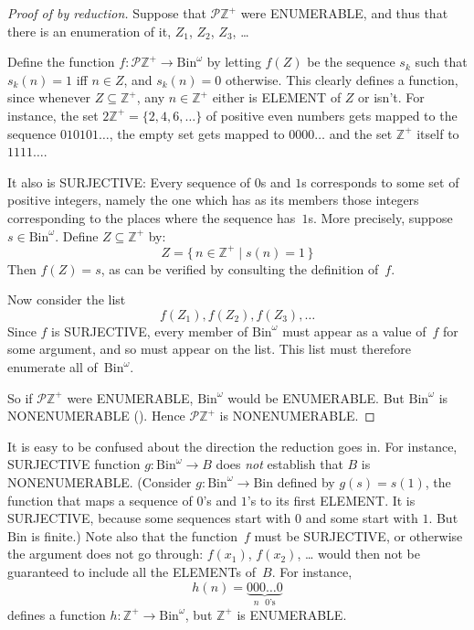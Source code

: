 \documentclass[10pt,a4paper]{article}
\makeatletter
\newcommand*{\olup}[1]{\MakeUppercase{#1}}
\theoremstyle{plain}
\theoremstyle{definition}
\theoremstyle{remark}
\newenvironment{explain}{}{}
\newcommand{\olref}{\@ifnextchar[{\olref@i}{\olref@final}}
\def\olref@i[#1]{\@ifnextchar[{\olref@ii}{\olref@final}}
\def\olref@ii[#1]{\@ifnextchar[{\olref@iii}{\olref@final}}
\def\olref@iii[#1]{\olref@final}
\def\olref@final#1{\ref{#1}}
\providecommand{\PosInt}{\mathbb{Z}^{+}}
\providecommand{\Bin}{\mathrm{Bin}}
\providecommand{\Pow}{\mathcal{P}}
\providecommand{\Setabs}[2]{\{\, #1 \mid #2 \,\}}
\makeatother
\begin{document}
\begin{proof}[Proof of {\olref[nen]{thm:nonenum-pownat}} by reduction]
Suppose that $\Pow{\PosInt}$ were \olup{enumerable}, and thus that
there is an enumeration of it, $Z_{1}$, $Z_{2}$, $Z_{3}$, \dots

Define the function $f \colon \Pow{\PosInt} \to \Bin^\omega$ by letting
$f(Z)$ be the sequence $s_{k}$ such that $s_{k}(n) = 1$ iff $n \in Z$,
and $s_k(n) = 0$ otherwise.  This clearly defines a function, since
whenever $Z \subseteq \PosInt$, any $n \in \PosInt$ either is
\olup{element} of $Z$ or isn't.  For instance, the set $2\PosInt = \{2,
4, 6, \dots\}$ of positive even numbers gets mapped to the sequence
$010101\dots$, the empty set gets mapped to $0000\dots$ and the set
$\PosInt$ itself to $1111\dots$.

It also is \olup{surjective}: Every sequence of $0$s and $1$s corresponds
to some set of positive integers, namely the one which has as its
members those integers corresponding to the places where the sequence
has~$1$s. More precisely, suppose $s \in \Bin^\omega$.  Define $Z
\subseteq \PosInt$ by:
\[
Z = \Setabs{n \in \PosInt}{s(n) = 1}
\]
Then $f(Z) = s$, as can be verified by consulting the definition
of~$f$.

Now consider the list
\[
f(Z_1), f(Z_2), f(Z_3), \dots
\]
Since $f$ is \olup{surjective}, every member of $\Bin^\omega$ must
appear as a value of~$f$ for some argument, and so must appear on the
list. This list must therefore enumerate all of~$\Bin^\omega$.

So if $\Pow{\PosInt}$ were \olup{enumerable}, $\Bin^\omega$ would be
\olup{enumerable}.  But $\Bin^\omega$ is \olup{nonenumerable}
(\olref[nen]{thm:nonenum-bin-omega}). Hence $\Pow{\PosInt}$ is
\olup{nonenumerable}.
\end{proof}

\begin{explain}
It is easy to be confused about the direction the reduction goes in.
For instance, \olup{surjective} function $g \colon \Bin^\omega \to B$
does \emph{not} establish that $B$ is \olup{nonenumerable}.  (Consider $g
\colon \Bin^\omega \to \Bin$ defined by $g(s) = s(1)$, the function
that maps a sequence of $0$'s and $1$'s to its first \olup{element}.  It
is \olup{surjective}, because some sequences start with $0$ and some start
with $1$. But $\Bin$ is finite.)  Note also that the function~$f$ must
be \olup{surjective}, or otherwise the argument does not go through:
$f(x_1)$, $f(x_2)$, \dots{} would then not be guaranteed to include
all the \olup{element}s of~$B$. For instance, 
\[
h(n) = \underbrace{000\dots0}_{\text{$n$ $0$'s}}
\]
defines a function $h\colon \PosInt \to
\Bin^\omega$, but $\PosInt$ is \olup{enumerable}.
\end{explain}
\end{document}
